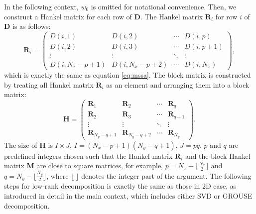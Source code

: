 In the following context, $w_0$ is omitted for notational convenience. Then, we construct a Hankel matrix for each row of $\mathbf{D}$. The Hankel matrix $\mathbf{R}_i$ for row $i$ of $\mathbf{D}$ is as follows:
\begin{equation}
\label{eq:data}
\mathbf{R}_i=\left(\begin{array}{cccc}
D(i,1) & D(i,2) & \cdots &D(i,p) \\
D(i,2) & D(i,3)  &\cdots &D(i,p+1) \\
\vdots & \vdots &\ddots &\vdots \\
D(i,N_x-p+1)&D(i,N_x-p+2) &\cdots&D(i,N_x)
\end{array}
\right),
\end{equation}
which is exactly the same as equation \ref{eq:mssa}. The block matrix is constructed by treating all Hankel matrix $\mathbf{R}_i$ as an element and arranging them into a block matrix:
\begin{equation}
\label{eq:hankel2}
\mathbf{H}=\left(\begin{array}{cccc}
\mathbf{R}_1 &\mathbf{R}_2 & \cdots &\mathbf{R}_q \\
\mathbf{R}_2 &\mathbf{R}_3 &\cdots &\mathbf{R}_{q+1} \\
\vdots & \vdots &\ddots &\vdots \\
\mathbf{R}_{N_y-q+1}&\mathbf{R}_{N_y-q+2} &\cdots&\mathbf{R}_{N_y}
\end{array}
\right).
\end{equation}
The size of $\mathbf{H}$ is $I\times J$, $I=(N_x-p+1)(N_y-q+1)$, $J=pq$. $p$ and $q$ are predefined integers chosen such that the Hankel matrix $\mathbf{R}_i$ and the block Hankel matrix $\mathbf{M}$  are close to square matrices, for example, $p=N_x-\lfloor\frac{N_x}{2}\rfloor$ and $q=N_y-\lfloor\frac{N_y}{2}\rfloor$, where $\lfloor\cdot\rfloor$ denotes the integer part of the argument. The following steps for low-rank decomposition is exactly the same as those in 2D case, as introduced in detail in the main context, which includes either SVD or GROUSE decomposition.

